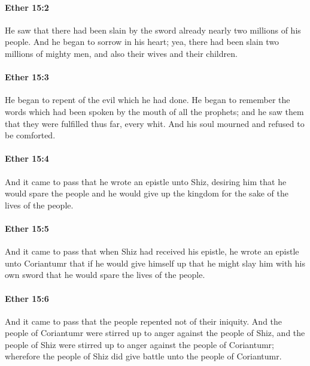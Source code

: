		\paragraph{Ether 15:2} %
			\label{ETHER-15-2}

			He saw that there had been slain by the sword
			already nearly two millions of his people.
			And he began to sorrow in his heart;
			yea, there had been slain two millions of mighty men,
			and also their wives and their children.

		\paragraph{Ether 15:3} %
			\label{ETHER-15-3}

			He began to repent of the evil which he had done.
			He began to remember the words
			which had been spoken by the mouth of all the prophets;
			and he saw them that they were fulfilled thus far, every whit.
			And his soul mourned and refused to be comforted.

		\paragraph{Ether 15:4} %
			\label{ETHER-15-4}

			And it came to pass that he wrote an epistle unto Shiz,
			desiring him that he would spare the people
			and he would give up the kingdom for the sake of the lives of the people.

		\paragraph{Ether 15:5} %
			\label{ETHER-15-5}

			And it came to pass that when Shiz had received his epistle,
			he wrote an epistle unto Coriantumr
			that if he would give himself up that he might slay him with his own sword
			that he would spare the lives of the people.

		\paragraph{Ether 15:6} %
			\label{ETHER-15-6}

			And it came to pass that the people repented not of their iniquity.
			And the people of Coriantumr were stirred up to anger against the people of Shiz,
			and the people of Shiz were stirred up to anger against the people of Coriantumr;
			wherefore the people of Shiz did give battle unto the people of Coriantumr.

